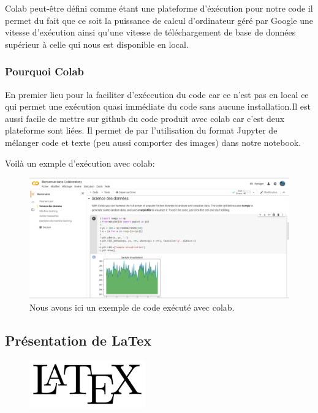 Colab peut-être défini comme étant une plateforme d'éxécution pour notre code
il permet du fait que ce soit la puissance de calcul d'ordinateur géré par Google une vitesse d'exécution ainsi qu'une vitesse de téléchargement de base de données supérieur à celle qui nous est disponible en local.

\subsubsection{Pourquoi Colab}
En premier lieu pour la faciliter d'exéccution du code car ce n'est pas en local ce qui permet une exécution quasi immédiate du code sans aucune installation.Il est aussi facile de mettre sur github du code produit avec colab car c'est deux plateforme sont liées. Il permet de par l'utilisation du format Jupyter de mélanger code et texte (peu aussi comporter des images) dans notre notebook.

Voilà un exmple d'exécution avec colab:

\begin{figure}[h]
\begin{center}
\includegraphics[width=15cm]{./images/Cap_colab.PNG}
\caption{Nous avons ici un exemple de code exécuté avec colab.}
\end{center}
\end{figure}


\subsection{Présentation de LaTex}

\begin{figure}[h]
  \begin{center}
\includegraphics[width=5cm]{./images/Latex.png}
\end{center}
\end{figure}

